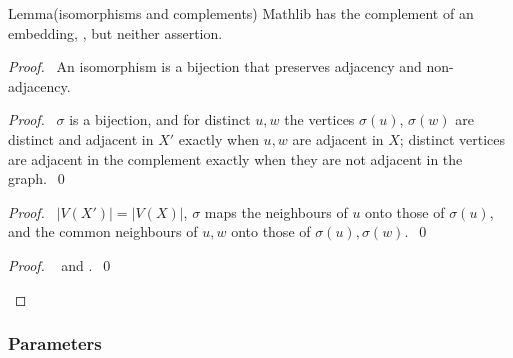 \begin{namedresult}{Lemma}{(isomorphisms and complements)}\label{lem:414-iso}
 \uses{}
 Mathlib has the complement of an embedding, , but neither
 assertion.
\end{namedresult}
\begin{proof}
 \pfsketch\ An isomorphism is a bijection that preserves adjacency and non-adjacency.
 \begin{proof}\pf\ $\sigma$ is a bijection, and for distinct $u,w$ the vertices $\sigma(u)$,
  $\sigma(w)$ are distinct and adjacent in $X'$ exactly when $u,w$ are adjacent in $X$; distinct
  vertices are adjacent in the complement exactly when they are not adjacent in the
  graph.~\qed\end{proof}
 \begin{proof}\pf\ $|V(X')|=|V(X)|$, $\sigma$ maps the neighbours of $u$ onto those of $\sigma(u)$,
  and the common neighbours of $u,w$ onto those of $\sigma(u),\sigma(w)$.~\qed\end{proof}
 \qedstep
 \begin{proof}\pf\  and .~\qed\end{proof}
\end{proof}

\subsubsection*{Parameters}

